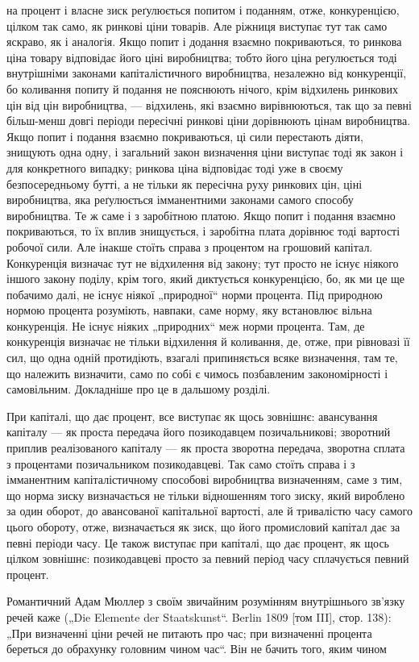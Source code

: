 \parcont{}  %
на процент і власне зиск реґулюється попитом і поданням, отже,
конкуренцією, цілком так само, як ринкові ціни товарів. Але ріжниця
виступає тут так само яскраво, як і аналогія. Якщо попит
і додання взаємно покриваються, то ринкова ціна товару відповідає
його ціні виробництва; тобто його ціна реґулюється тоді
внутрішніми законами капіталістичного виробництва, незалежно
від конкуренції, бо коливання попиту й подання не пояснюють
нічого, крім відхилень ринкових цін від цін виробництва, — відхилень,
які взаємно вирівнюються, так що за певні більш-менш довгі
періоди пересічні ринкові ціни дорівнюють цінам виробництва.
Якщо попит і подання взаємно покриваються, ці сили перестають
діяти, знищують одна одну, і загальний закон визначення ціни
виступає тоді як закон і для конкретного випадку; ринкова ціна
відповідає тоді уже в своєму безпосередньому бутті, а не тільки
як пересічна руху ринкових цін, ціні виробництва, яка реґулюється
імманентними законами самого способу виробництва.
Те ж саме і з заробітною платою. Якщо попит і подання взаємно
покриваються, то їх вплив знищується, і заробітна плата дорівнює
тоді вартості робочої сили. Але інакше стоїть справа з процентом
на грошовий капітал. Конкуренція визначає тут не відхилення
від закону; тут просто не існує ніякого іншого закону поділу,
крім того, який диктується конкуренцією, бо, як ми це ще
побачимо далі, не існує ніякої „природної“ норми процента. Під
природною нормою процента розуміють, навпаки, саме норму,
яку встановлює вільна конкуренція. Не існує ніяких „природних“
меж норми процента. Там, де конкуренція визначає не тільки відхилення
й коливання, де, отже, при рівновазі її сил, що одна одній
протидіють, взагалі припиняється всяке визначення, там те, що
належить визначити, само по собі є чимось позбавленим закономірності
і самовільним. Докладніше про це в дальшому розділі.

При капіталі, що дає процент, все виступає як щось зовнішнє:
авансування капіталу — як проста передача його позикодавцем
позичальникові; зворотний приплив реалізованого капіталу — як
проста зворотна передача, зворотна сплата з процентами позичальником
позикодавцеві. Так само стоїть справа і з імманентним
капіталістичному способові виробництва визначенням, саме з тим,
що норма зиску визначається не тільки відношенням того зиску,
який вироблено за один оборот, до авансованої капітальної вартості,
але й тривалістю часу самого цього обороту, отже, визначається
як зиск, що його промисловий капітал дає за певні
періоди часу. Це також виступає при капіталі, що дає процент,
як щось цілком зовнішнє: позикодавцеві просто за певний період
часу сплачується певний процент.

Романтичний Адам Мюллер з своїм звичайним розумінням
внутрішнього зв’язку речей каже („Die Elemente der Staatskunst“.
Berlin 1809 [том III], стор. 138): „При визначенні ціни речей не
питають про час; при визначенні процента береться до обрахунку
головним чином час“. Він не бачить того, яким чином
\parbreak{}  %
